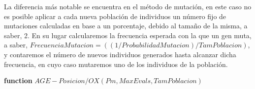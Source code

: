 \documentclass[11pt,a4paper]{article}
\begin{document}
	\noindent La diferencia más notable se encuentra en el método de mutación, en este caso no es posible aplicar a cada nueva población de individuos un número fijo de mutaciones calculadas en base a un porcentaje, debido al tamaño de la misma, a saber, 2. En su lugar calcularemos la frecuencia esperada con la que un gen muta, a saber, $FrecuenciaMutacion = ((1/ProbabilidadMutacion)/TamPoblacion)$, y contaremos el número de nuevos individuos generados hasta alcanzar dicha frecuencia, en cuyo caso mutaremos uno de los individuos de la población.\\
	
	
		\begin{algorithm} [!h]
			
			\textbf{function} $AGE-Posicion/OX(Pm, MaxEvals, TamPoblacion)$
\end{algorithm}
\end{document}
